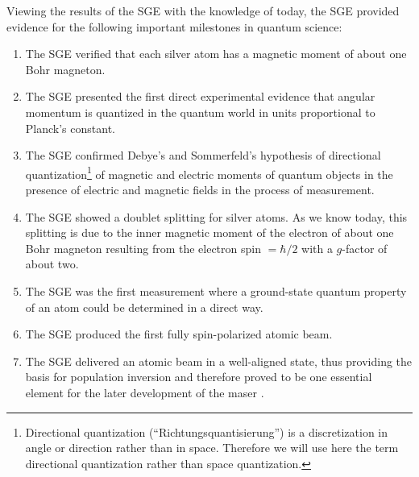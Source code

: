 \documentclass[12pt]{article}
\begin{document}
Viewing the results of the SGE with the knowledge of today, the SGE provided evidence for the following important milestones in quantum science:   
\begin{enumerate}                                                                                                                                                                                                                                
\item The SGE verified that each silver atom has a magnetic moment of about one Bohr magneton.
\item The SGE presented the first direct experimental evidence that angular momentum is quantized in the quantum world in units proportional to Planck's constant.                       
\item The SGE confirmed  Debye's and Sommerfeld's hypothesis of directional quantization\footnote{Directional quantization (``Richtungsquantisierung'') is a discretization in angle or direction rather than in space. Therefore we will use here the term directional quantization rather than space quantization.}  of magnetic and electric moments of quantum objects in the presence of electric and magnetic fields in the process of measurement.                                                                                                                                                                                                
\item The SGE showed a doublet splitting for silver atoms. As we know today, this splitting is due to the inner magnetic moment of the electron of about one Bohr magneton resulting from the electron spin $= \hbar/2$ with a $g$-factor of about two.                                                                                                                                                           
\item The SGE was the first measurement where a ground-state quantum property of an atom could be determined in a direct way.                                                                                                                                                                                       
\item The SGE produced the first fully spin-polarized atomic beam.                                                                                                    
\item The SGE delivered an atomic beam in a well-aligned state, thus providing the basis for population inversion and therefore proved to be one essential element for the later development of the maser \citep{GordonJEtal1955Maser}.                                                                                        

\end{enumerate}
\end{document}
